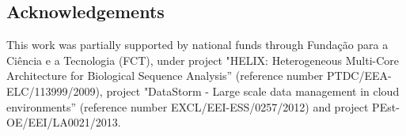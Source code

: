 \documentclass{bmcart}
\begin{document}
\begin{backmatter}

    
\section*{Acknowledgements}

This work was partially supported by national funds through Fundação
para a Ciência e a Tecnologia (FCT), under project "HELIX:
Heterogeneous Multi-Core Architecture for Biological Sequence
Analysis'' (reference number PTDC/EEA-ELC/113999/2009), project "DataStorm - Large scale data management in cloud
environments'' (reference number EXCL/EEI-ESS/0257/2012) and project PEst-OE/EEI/LA0021/2013. 
 

\newpage
{
   }     %





\end{backmatter}
\end{document}
